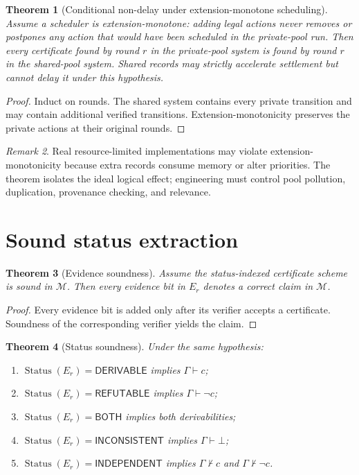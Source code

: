 \documentclass[11pt]{article}
\newtheorem{theorem}{Theorem}[section]
\theoremstyle{definition}
\theoremstyle{remark}
\newtheorem{remark}[theorem]{Remark}
\newcommand{\Status}{\operatorname{Status}}
\newcommand{\Der}{\mathsf{DERIVABLE}}
\newcommand{\Refut}{\mathsf{REFUTABLE}}
\newcommand{\Both}{\mathsf{BOTH}}
\newcommand{\Ind}{\mathsf{INDEPENDENT}}
\newcommand{\Inc}{\mathsf{INCONSISTENT}}
\newcommand{\M}{\mathcal M}
\newcommand{\Gammaa}{\Gamma}
\newcommand{\bottomf}{\bot}
\begin{document}
\begin{theorem}[Conditional non-delay under extension-monotone scheduling]
Assume a scheduler is \emph{extension-monotone}: adding legal actions never removes or postpones any action that would have been scheduled in the private-pool run. Then every certificate found by round $r$ in the private-pool system is found by round $r$ in the shared-pool system. Shared records may strictly accelerate settlement but cannot delay it under this hypothesis.
\end{theorem}

\begin{proof}
Induct on rounds. The shared system contains every private transition and may contain additional verified transitions. Extension-monotonicity preserves the private actions at their original rounds.
\end{proof}

\begin{remark}
Real resource-limited implementations may violate extension-monotonicity because extra records consume memory or alter priorities. The theorem isolates the ideal logical effect; engineering must control pool pollution, duplication, provenance checking, and relevance.
\end{remark}

\section{Sound status extraction}

\begin{theorem}[Evidence soundness]
Assume the status-indexed certificate scheme is sound in $\M$. Then every evidence bit in $E_r$ denotes a correct claim in $\M$.
\end{theorem}

\begin{proof}
Every evidence bit is added only after its verifier accepts a certificate. Soundness of the corresponding verifier yields the claim.
\end{proof}

\begin{theorem}[Status soundness]
Under the same hypothesis:
\begin{enumerate}[label=(\roman*)]
  \item $\Status(E_r)=\Der$ implies $\Gammaa\vdash c$;
  \item $\Status(E_r)=\Refut$ implies $\Gammaa\vdash\neg c$;
  \item $\Status(E_r)=\Both$ implies both derivabilities;
  \item $\Status(E_r)=\Inc$ implies $\Gammaa\vdash\bottomf$;
  \item $\Status(E_r)=\Ind$ implies $\Gammaa\nvdash c$ and $\Gammaa\nvdash\neg c$.
\end{enumerate}
\end{theorem}
\end{document}
